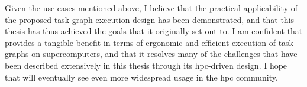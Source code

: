 Given the use-cases mentioned above, I believe that the practical applicability of the proposed
task graph execution design has been demonstrated, and that this thesis has thus achieved the goals
that it originally set out to. I am confident that \hyperqueue{} provides a tangible
benefit in terms of ergonomic and efficient execution of task graphs on supercomputers, and that it
resolves many of the challenges that have been described extensively in this thesis through its
\gls{hpc}-driven design. I hope that \hyperqueue{} will eventually
see even more widespread usage in the \gls{hpc} community.
